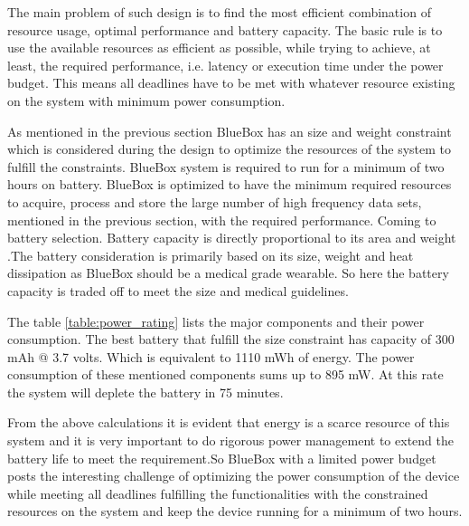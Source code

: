 \hspace{10mm}The main problem of such design is to find the most efficient combination of resource usage, optimal performance and battery capacity. The basic rule is to use the available resources as efficient as possible, while trying to achieve, at least, the required performance, i.e. latency or execution time under the power budget. This means all deadlines have to be met with whatever resource existing on the system with minimum power consumption. 


\hspace{10mm}As mentioned in the previous section BlueBox has an size and weight constraint which is considered during the design to optimize the resources of the system to fulfill the constraints. BlueBox system is required to run for a minimum of two hours on battery.  
BlueBox is optimized to have the minimum required resources to acquire, process and store the large number of high frequency data sets, mentioned in the previous section, with the required performance.  
Coming to battery selection. Battery capacity is directly proportional to its area and weight\cite{} .The battery consideration is primarily based on its size, weight and heat dissipation as BlueBox should be a medical grade wearable. So here the battery capacity is traded off to meet the size and medical guidelines.  

The table \ref{table:power_rating} lists the major components and their power consumption. The best battery that fulfill the size constraint has capacity of 300 mAh @ 3.7 volts. Which is equivalent to 1110 mWh of energy. The power consumption of these mentioned components sums up to 895 mW. At this rate the system will deplete the battery in 75 minutes. 

From the above  calculations it is evident that energy is a scarce resource of this system and it is very important to do rigorous power management to extend the battery life to meet the requirement.So BlueBox with a limited power budget posts the interesting challenge of optimizing the power consumption of the  device while meeting all deadlines fulfilling the functionalities with the constrained resources on the system and keep the device running for a minimum of two hours.

